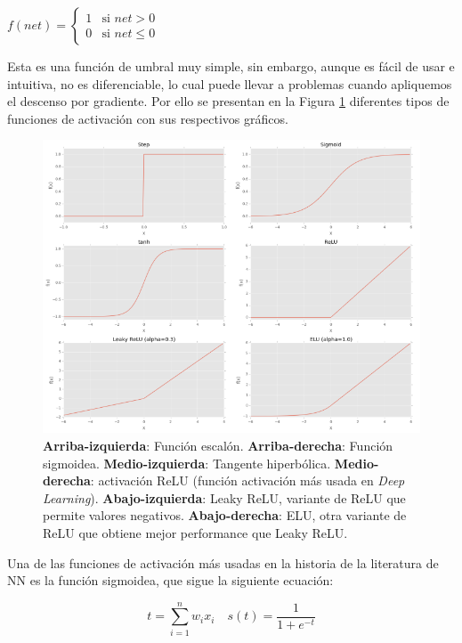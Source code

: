 \documentclass[a4paper,12pt]{article}
\begin{document}
$
f(net) =
\left\{
	\begin{array}{ll}
		1  	& \mbox{si } net > 0 \\
		0 	& \mbox{si } net \leq 0
	\end{array}
\right.
$

Esta es una función de umbral muy simple, sin embargo, aunque es fácil de usar e intuitiva, no es diferenciable, lo cual puede llevar a problemas cuando apliquemos el descenso por gradiente.
Por ello se presentan en la Figura \ref{fig:typesfactivation} diferentes tipos de funciones de activación con sus respectivos gráficos.

\begin{figure}[H]
	\begin{center}				
	\includegraphics[width=1\textwidth]{021.png}
  	\caption{\textbf{Arriba-izquierda}: Función escalón. \textbf{Arriba-derecha}: Función sigmoidea. \textbf{Medio-izquierda}: Tangente hiperbólica. \textbf{Medio-derecha}: activación ReLU (función activación más usada en \textit{Deep Learning}).
 \textbf{Abajo-izquierda}: Leaky ReLU, variante de ReLU que permite valores negativos. \textbf{Abajo-derecha}:
ELU, otra variante de ReLU que obtiene mejor performance que Leaky ReLU.}
  	\label{fig:typesfactivation}
  	\end{center}
\end{figure}

Una de las funciones de activación más usadas en la historia de la literatura de NN es la función sigmoidea, que sigue la siguiente ecuación:

\begin{equation}
t=\sum_{i=1}^{n}w_ix_i \quad s(t)=\frac{1}{1+e^{-t}}
\end{equation}
\end{document}
